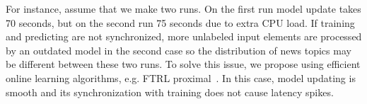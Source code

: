 For instance, assume that we make two runs. On the first run model update takes 70 seconds, but on the second run 75 seconds due to extra CPU load. If training and predicting are not synchronized, more unlabeled input elements are processed by an outdated model in the second case so the distribution of news topics may be different between these two runs. To solve this issue, we propose using efficient online learning algorithms, e.g. FTRL proximal~\cite{mcmahan2013ad}. In this case, model updating is smooth and its synchronization with training does not cause latency spikes.